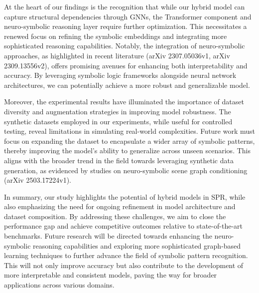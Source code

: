 \documentclass{article}
\begin{document}
At the heart of our findings is the recognition that while our hybrid model can capture structural dependencies through GNNs, the Transformer component and neuro-symbolic reasoning layer require further optimization. This necessitates a renewed focus on refining the symbolic embeddings and integrating more sophisticated reasoning capabilities. Notably, the integration of neuro-symbolic approaches, as highlighted in recent literature (arXiv 2307.05036v1, arXiv 2309.13556v2), offers promising avenues for enhancing both interpretability and accuracy. By leveraging symbolic logic frameworks alongside neural network architectures, we can potentially achieve a more robust and generalizable model.

Moreover, the experimental results have illuminated the importance of dataset diversity and augmentation strategies in improving model robustness. The synthetic datasets employed in our experiments, while useful for controlled testing, reveal limitations in simulating real-world complexities. Future work must focus on expanding the dataset to encapsulate a wider array of symbolic patterns, thereby improving the model's ability to generalize across unseen scenarios. This aligns with the broader trend in the field towards leveraging synthetic data generation, as evidenced by studies on neuro-symbolic scene graph conditioning (arXiv 2503.17224v1).

In summary, our study highlights the potential of hybrid models in SPR, while also emphasizing the need for ongoing refinement in model architecture and dataset composition. By addressing these challenges, we aim to close the performance gap and achieve competitive outcomes relative to state-of-the-art benchmarks. Future research will be directed towards enhancing the neuro-symbolic reasoning capabilities and exploring more sophisticated graph-based learning techniques to further advance the field of symbolic pattern recognition. This will not only improve accuracy but also contribute to the development of more interpretable and consistent models, paving the way for broader applications across various domains.
\end{document}
